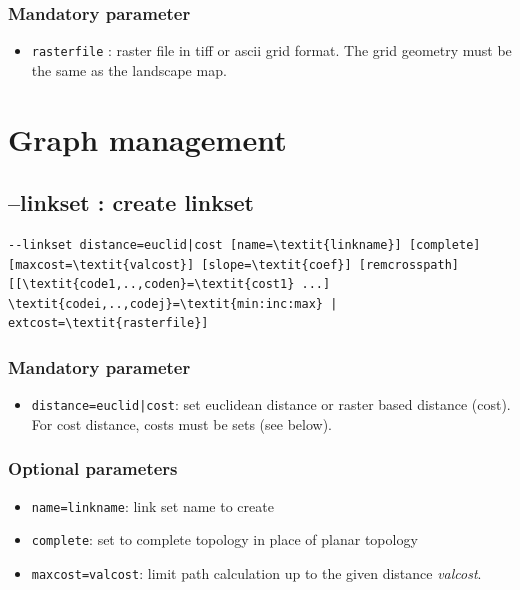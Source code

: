 \documentclass[a4paper,10pt]{report}
\begin{document}
\subsubsection{Mandatory parameter}
\begin{itemize}
	\item \verb|rasterfile| : raster file in tiff or ascii grid format. The grid geometry must be the same as the landscape map.
\end{itemize}

\section{Graph management}

\subsection{--linkset : create linkset}
\begin{Verbatim}[commandchars=\\\{\}]
--linkset distance=euclid|cost [name=\textit{linkname}] [complete] [maxcost=\textit{valcost}] [slope=\textit{coef}] [remcrosspath] 
[[\textit{code1,..,coden}=\textit{cost1} ...] \textit{codei,..,codej}=\textit{min:inc:max} | extcost=\textit{rasterfile}]
\end{Verbatim}

\subsubsection{Mandatory parameter}
\begin{itemize}
	\item \verb-distance=euclid|cost-: set euclidean distance or raster based distance (cost). For cost distance, costs must be sets (see below).
\end{itemize}

\subsubsection{Optional parameters}
\begin{itemize}
	\item \verb|name=linkname|: link set name to create
	\item \verb|complete|: set to complete topology in place of planar topology
	\item \verb|maxcost=valcost|: limit path calculation up to the given distance \textit{valcost}.
\end{itemize}
\end{document}
